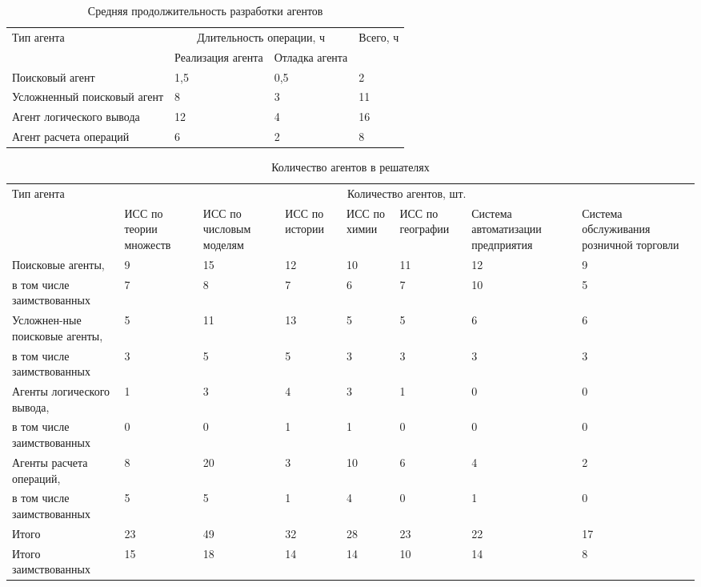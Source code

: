 \documentclass{thesisby}
\begin{document}
\begin{table} [H]
  \small
  \caption{Средняя продолжительность разработки агентов}\label{TimeNormTable}
\begin{tabularx}{\hsize}{| X | X | X | X |}
  \hline
 \multirow{2}{*}{Тип агента} &\multicolumn{2}{c|}{Длительность операции, ч } & \multirow{2}{*}{Всего, ч}\\
 \cline{2-3}
  & Реализация агента & Отладка агента & \\
\hline
 
Поисковый агент	& 1,5	& 0,5	& 2\\
\hline
Усложненный поисковый агент	& 8	& 3	& 11\\
\hline
Агент логического вывода	& 12	& 4	& 16\\
\hline
Агент расчета операций	& 6	& 2	& 8\\
\hline
\end{tabularx}
\end{table}


\begin{table} [H]
  \small
  \caption{Количество агентов в решателях}\label{AgentsCountTable}
\begin{tabularx}{\hsize}{| p{2.5cm} | X | X | X | X | X | X | X |}
  \hline
 \multirow{2}{*}{Тип агента} &\multicolumn{7}{c|}{Количество агентов, шт.}\\
 \cline{2-8}
 & ИСС по теории множеств & ИСС по числовым моделям	& ИСС по истории	& ИСС по химии	& ИСС по географии	& Система автоматизации предприятия	& Система обслуживания розничной торговли\\
\hline
Поисковые агенты,  & 9 & 15 & 12 & 10 & 11 & 12 & 9\\
\cline{2-8}
в том числе заимствованных & 7 & 8 & 7 & 6 & 7 & 10 & 5\\
\hline
Усложнен-ные поисковые агенты, & 5 & 11 & 13 & 5 & 5 & 6 & 6\\
\cline{2-8}
в том числе заимствованных & 3 & 5 & 5 & 3 & 3 & 3 & 3\\
\hline
Агенты \mbox{логического} вывода, & 1 & 3 & 4 & 3 & 1 & 0 & 0\\
\cline{2-8}
в том числе заимствованных & 0 & 0 & 1 & 1 & 0 & 0 & 0\\
\hline
Агенты расчета операций, & 8 & 20 & 3 & 10 & 6 & 4 & 2\\
\cline{2-8}
в том числе заимствованных & 5 & 5 & 1 & 4 & 0 & 1 & 0\\
\hline
Итого  & 23 & 49 & 32 & 28 & 23 & 22 & 17\\
\hline
Итого заимствованных & 15 & 18 & 14 & 14 & 10 & 14 & 8\\
\hline

\end{tabularx}
\end{table}
\end{document}
